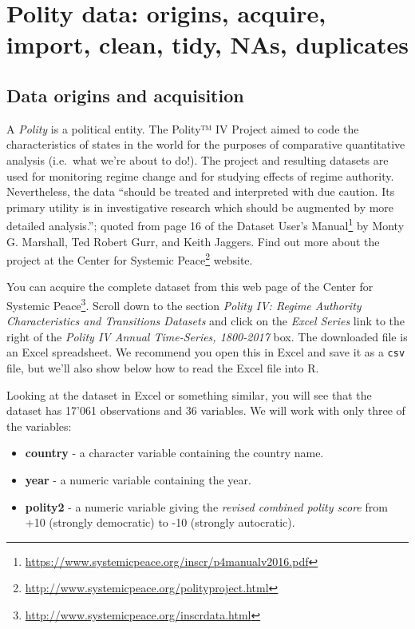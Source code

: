 \documentclass[]{book}
\providecommand{\tightlist}{%
  \setlength{\itemsep}{0pt}\setlength{\parskip}{0pt}}
\renewcommand{\href}[2]{#2\footnote{\url{#1}}}
\begin{document}
\hypertarget{polity-data-origins-acquire-import-clean-tidy-nas-duplicates}{%
\section{Polity data: origins, acquire, import, clean, tidy, NAs, duplicates}\label{polity-data-origins-acquire-import-clean-tidy-nas-duplicates}}

\hypertarget{data-origins-and-acquisition}{%
\subsection{Data origins and acquisition}\label{data-origins-and-acquisition}}

A \emph{Polity} is a political entity. The Polity™ IV Project aimed to code the characteristics of states in the world for the purposes of comparative quantitative analysis (i.e.~what we're about to do!). The project and resulting datasets are used for monitoring regime change and for studying effects of regime authority. Nevertheless, the data ``should be treated and interpreted with due caution. Its primary utility is in investigative research which should be augmented by more detailed analysis.''; quoted from page 16 of the \href{https://www.systemicpeace.org/inscr/p4manualv2016.pdf}{Dataset User's Manual} by Monty G. Marshall, Ted Robert Gurr, and Keith Jaggers. Find out more about the project at the \href{http://www.systemicpeace.org/polityproject.html}{Center for Systemic Peace} website.

You can acquire the complete dataset from \href{http://www.systemicpeace.org/inscrdata.html}{this web page of the Center for Systemic Peace}. Scroll down to the section \emph{Polity IV: Regime Authority Characteristics and Transitions Datasets} and click on the \emph{Excel Series} link to the right of the \emph{Polity IV Annual Time-Series, 1800-2017} box. The downloaded file is an Excel spreadsheet. We recommend you open this in Excel and save it as a \texttt{csv} file, but we'll also show below how to read the Excel file into R.

Looking at the dataset in Excel or something similar, you will see that the dataset has 17'061 observations and 36 variables. We will work with only three of the variables:

\begin{itemize}
\tightlist
\item
  \textbf{country} - a character variable containing the country name.
\item
  \textbf{year} - a numeric variable containing the year.
\item
  \textbf{polity2} - a numeric variable giving the \emph{revised combined polity score} from +10 (strongly democratic) to -10 (strongly autocratic).
\end{itemize}
\end{document}
